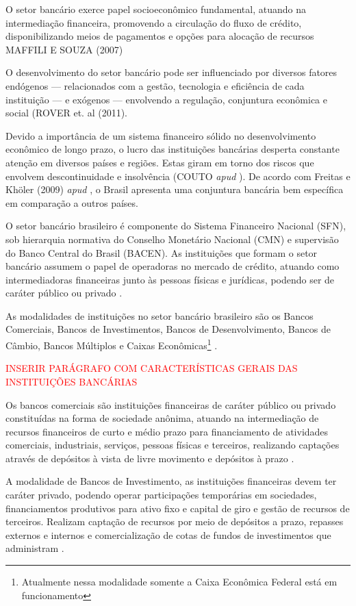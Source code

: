 \documentclass[12pt,openright,oneside,a4paper,chapter=TITLE,section=TITLE,subsection=Title,english,french,spanish,portugues,sumario=tradicional]{04-class-files/abntex2}
\begin{document}
O setor bancário exerce papel socioeconômico fundamental, atuando na
intermediação financeira, promovendo a circulação do fluxo de crédito,
disponibilizando meios de pagamentos e opções para alocação de recursos MAFFILI
E SOUZA (2007)

O desenvolvimento do setor bancário pode ser influenciado por diversos fatores
endógenos --- relacionados com a gestão, tecnologia e eficiência de cada
instituição --- e exógenos --- envolvendo a regulação, conjuntura econômica e
social (ROVER et. al (2011).

Devido a importância de um sistema financeiro sólido no desenvolvimento
econômico de longo prazo, o lucro das instituições bancárias desperta constante
atenção em diversos países e regiões. Estas giram em torno dos riscos que
envolvem descontinuidade e insolvência (COUTO \emph{apud} \cite{dantas:2012}). De
acordo com Freitas e Khöler (2009) \emph{apud} \textcite{dantas:2012}, o Brasil
apresenta uma conjuntura bancária bem específica em comparação a outros países.

O setor bancário brasileiro é componente do Sistema Financeiro Nacional (SFN),
sob hierarquia normativa do Conselho Monetário Nacional (CMN) e supervisão do
Banco Central do Brasil (BACEN). As instituições que formam o setor bancário
assumem o papel de operadoras no mercado de crédito, atuando como
intermediadoras financeiras junto às pessoas físicas e jurídicas, podendo ser
de caráter público ou privado \cite{Lei:4595:1964}.

As modalidades de instituições no setor bancário brasileiro são os Bancos
Comerciais, Bancos de Investimentos, Bancos de Desenvolvimento, Bancos de
Câmbio, Bancos Múltiplos e Caixas Econômicas\footnote{Atualmente nessa
modalidade somente a Caixa Econômica Federal está em funcionamento}
\cite{Lei:4595:1964}.

\textcolor{red}{INSERIR PARÁGRAFO COM CARACTERÍSTICAS GERAIS DAS INSTITUIÇÕES BANCÁRIAS}

Os bancos comerciais são instituições financeiras de caráter público ou privado
constituídas na forma de sociedade anônima, atuando na intermediação de
recursos financeiros de curto e médio prazo para financiamento de atividades
comerciais, industriais, serviços, pessoas físicas e terceiros, realizando
captações através de depósitos à vista de livre movimento e depósitos à prazo
\cite{Res:2099:1994}.

A modalidade de Bancos de Investimento, as instituições financeiras devem ter
caráter privado, podendo operar participações temporárias em sociedades,
financiamentos produtivos para ativo fixo e capital de giro e gestão de
recursos de terceiros. Realizam captação de recursos por meio de depósitos a
prazo, repasses externos e internos e comercialização de cotas de fundos de
investimentos que administram \cite{Res:2624:1999}.
\end{document}
